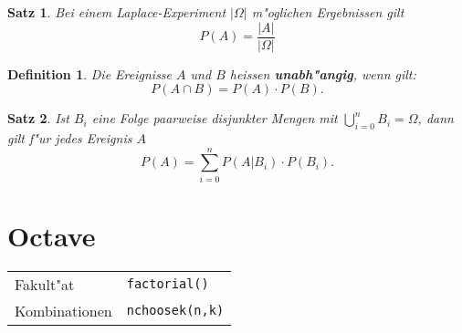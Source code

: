 \documentclass[ngerman, a4paper, 10pt, twocolumn, DIV20, headings=small]{scrartcl}
\newtheorem{definition}{Definition}
\newtheorem{satz}{Satz}
\begin{document}
\begin{satz}
  Bei einem Laplace-Experiment $| \Omega |$ m"oglichen Ergebnissen gilt
\[
P(A) = \frac{|A|}{|\Omega|}
\]
\end{satz}

\begin{definition}
Die Ereignisse $A$ und $B$ heissen {\bf unabh"angig}, wenn gilt:
\[
P(A\cap B) = P(A)\cdot P(B).
\]
\end{definition}

\begin{satz}
Ist $B_i$ eine Folge paarweise disjunkter Mengen mit $\bigcup_{i=0}^{n}B_i=\Omega$, dann gilt f"ur jedes Ereignis $A$
\[
P(A)=\sum_{i=0}^{n}P(A|B_i)\cdot P(B_i).
\]
\end{satz}

\section{Octave}
\label{sec:octave}

\begin{tabular}{l l}
  Fakult"at & \verb|factorial()| \\
  Kombinationen & \verb|nchoosek(n,k)| \\
\end{tabular}
\end{document}
